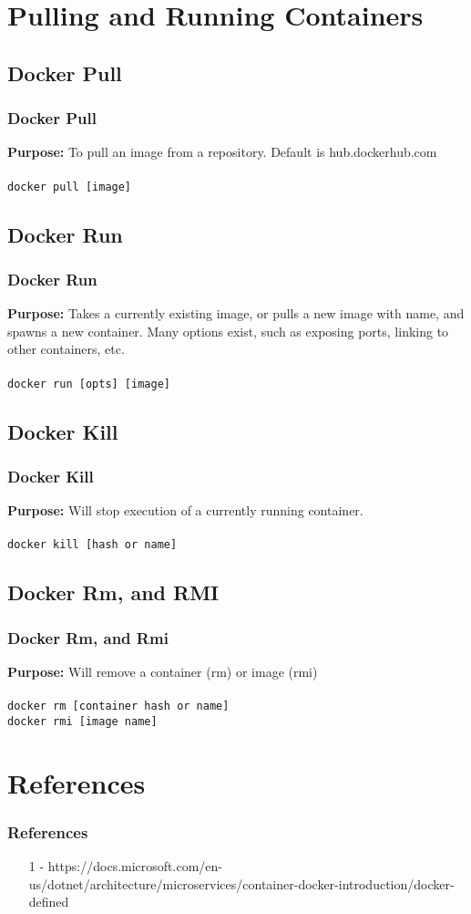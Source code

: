\documentclass{beamer}
\begin{document}
\section{Pulling and Running Containers}
\subsection{Docker Pull}
\begin{frame}\frametitle{Docker Pull}
  \textbf{Purpose:} To pull an image from a repository.  Default is hub.dockerhub.com
  \\ \\
  \texttt{docker pull [image]}
\end{frame}
\subsection{Docker Run}
\begin{frame}\frametitle{Docker Run}
  \textbf{Purpose:} Takes a currently existing image, or pulls a new image with name, and spawns a new container.  Many options exist, such as exposing ports, linking to other containers, etc.
  \\ \\
  \texttt{docker run [opts] [image]}
\end{frame}
\subsection{Docker Kill}
\begin{frame}\frametitle{Docker Kill}
  \textbf{Purpose:} Will stop execution of a currently running container.
  \\ \\
  \texttt{docker kill [hash or name]}  
\end{frame}
\subsection{Docker Rm, and RMI}
\begin{frame}\frametitle{Docker Rm, and Rmi}
  \textbf{Purpose:} Will remove a container (rm) or image (rmi)
  \\ \\
  \texttt{docker rm [container hash or name]}  \\
  \texttt{docker rmi [image name]}  \\  
\end{frame}

\section{References}
\begin{frame}\frametitle{References}
  \begin{itemize}
    \item [1] - https://docs.microsoft.com/en-us/dotnet/architecture/microservices/container-docker-introduction/docker-defined
  \end{itemize}
\end{frame}
\end{document}
